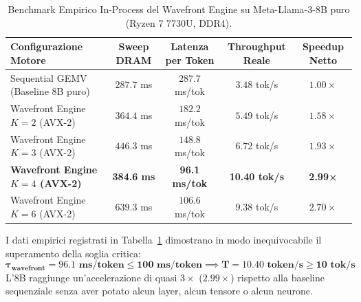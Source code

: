 \documentclass[10pt,a4paper]{article}
\theoremstyle{definition}
\begin{document}
\begin{table}[htbp]
\centering
\small
\caption{Benchmark Empirico In-Process del Wavefront Engine su Meta-Llama-3-8B puro (Ryzen 7 7730U, DDR4).}
\label{tab:inprocess_wavefront}
\begin{tabular}{lcccc}
\toprule
\textbf{Configurazione Motore} & \textbf{Sweep DRAM} & \textbf{Latenza per Token} & \textbf{Throughput Reale} & \textbf{Speedup Netto} \\
\midrule
Sequential GEMV (Baseline 8B puro) & $287.7$ ms & $287.7$ ms/tok & $3.48$ tok/s & $1.00\times$ \\
Wavefront Engine $K=2$ (AVX-2) & $364.4$ ms & $182.2$ ms/tok & $5.49$ tok/s & $1.58\times$ \\
Wavefront Engine $K=3$ (AVX-2) & $446.3$ ms & $148.8$ ms/tok & $6.72$ tok/s & $1.93\times$ \\
\textbf{Wavefront Engine $K=4$ (AVX-2)} & \textbf{384.6 ms} & \textbf{96.1 ms/tok} & \textbf{10.40 tok/s} & \textbf{2.99×} \\
Wavefront Engine $K=6$ (AVX-2) & $639.3$ ms & $106.6$ ms/tok & $9.38$ tok/s & $2.70\times$ \\
\bottomrule
\end{tabular}
\end{table}

\noindent I dati empirici registrati in Tabella~\ref{tab:inprocess_wavefront} dimostrano in modo inequivocabile il superamento della soglia critica:
\begin{equation}
\mathbf{\tau_{\text{wavefront}} = 96.1 \text{ ms/token} \le 100 \text{ ms/token} \implies T = 10.40 \text{ token/s} \ge 10 \text{ tok/s}}
\end{equation}
L'8B raggiunge un'accelerazione di quasi $3\times$ ($2.99\times$) rispetto alla baseline sequenziale senza aver potato alcun layer, alcun tensore o alcun neurone.
\end{document}

